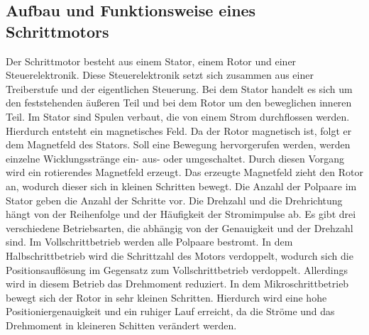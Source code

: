 \subsection{Aufbau und Funktionsweise eines Schrittmotors}
Der Schrittmotor besteht aus einem Stator, einem Rotor und einer Steuerelektronik. Diese Steuerelektronik setzt sich zusammen aus einer Treiberstufe und der eigentlichen Steuerung. Bei dem Stator handelt es sich um den feststehenden äußeren Teil und bei dem Rotor um den beweglichen inneren Teil. Im Stator sind Spulen verbaut, die von einem Strom durchflossen werden. Hierdurch entsteht ein magnetisches Feld. Da der Rotor magnetisch ist, folgt er dem Magnetfeld des Stators. Soll eine Bewegung hervorgerufen werden, werden einzelne Wicklungsstränge ein- aus- oder umgeschaltet. Durch diesen Vorgang wird ein rotierendes Magnetfeld erzeugt. Das erzeugte Magnetfeld zieht den Rotor an, wodurch dieser sich in kleinen Schritten bewegt. Die Anzahl der Polpaare im Stator geben die Anzahl der Schritte vor. Die Drehzahl und die Drehrichtung hängt von der Reihenfolge und der Häufigkeit der Stromimpulse ab. Es gibt drei verschiedene Betriebsarten, die abhängig von der Genauigkeit und der Drehzahl sind. Im Vollschrittbetrieb werden alle Polpaare bestromt. In dem Halbschrittbetrieb wird die Schrittzahl des Motors verdoppelt, wodurch sich die Positionsauflösung im Gegensatz zum Vollschrittbetrieb verdoppelt. Allerdings wird in diesem Betrieb das Drehmoment reduziert. In dem Mikroschrittbetrieb bewegt sich der Rotor in sehr kleinen Schritten. Hierdurch wird eine hohe Positioniergenauigkeit und ein ruhiger Lauf erreicht, da die Ströme und das Drehmoment in kleineren Schitten verändert werden. \cite{Hagl.2021}\cite{Bernstein.2018} 
